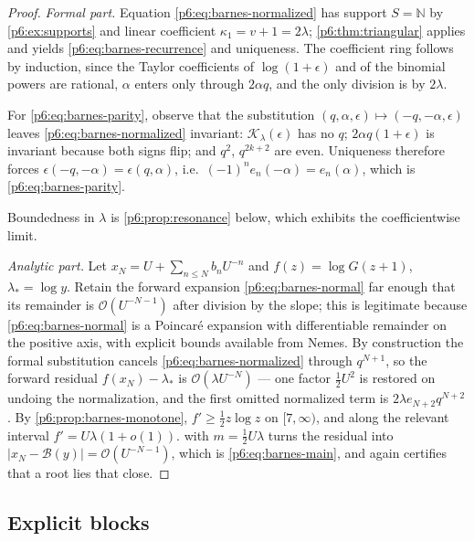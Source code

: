 \documentclass[11pt,a4paper,oneside]{book}
\theoremstyle{plain}
\theoremstyle{definition}
\theoremstyle{remark}
\newcommand{\Nat}{\mathbb{N}}
\newcommand{\bigO}{\mathcal{O}}
\newcommand{\littleo}{o}
\begin{document}
\begin{proof}
\emph{Formal part.}  Equation \eqref{p6:eq:barnes-normalized} has support
$S=\Nat$ by \cref{p6:ex:supports} and linear coefficient
$\kappa_1=v+1=2\lambda$; \cref{p6:thm:triangular} applies and yields
\eqref{p6:eq:barnes-recurrence} and uniqueness.  The coefficient ring follows
by induction, since the Taylor coefficients of $\log(1+\epsilon)$ and of the
binomial powers are rational, $\alpha$ enters only through $2\alpha q$, and
the only division is by $2\lambda$.

For \eqref{p6:eq:barnes-parity}, observe that the substitution
$(q,\alpha,\epsilon)\mapsto(-q,-\alpha,\epsilon)$ leaves
\eqref{p6:eq:barnes-normalized} invariant: $\mathcal{K}_\lambda(\epsilon)$ has
no $q$; $2\alpha q(1+\epsilon)$ is invariant because both signs flip; and
$q^{2}$, $q^{2k+2}$ are even.  Uniqueness therefore forces
$\epsilon(-q,-\alpha)=\epsilon(q,\alpha)$, i.e.\ $(-1)^{n}e_n(-\alpha)=
e_n(\alpha)$, which is \eqref{p6:eq:barnes-parity}.

Boundedness in $\lambda$ is \cref{p6:prop:resonance} below, which exhibits the
coefficientwise limit.

\emph{Analytic part.}  Let $x_N=U+\sum_{n\le N}b_nU^{-n}$ and
$f(z)=\log G(z+1)$, $\lambda_\ast=\log y$.  Retain the forward expansion
\eqref{p6:eq:barnes-normal} far enough that its remainder is
$\bigO(U^{-N-1})$ after division by the slope; this is legitimate because
\eqref{p6:eq:barnes-normal} is a Poincar\'e expansion with differentiable
remainder on the positive axis, with explicit bounds available from Nemes.
By construction the formal substitution cancels
\eqref{p6:eq:barnes-normalized} through $q^{N+1}$, so the forward residual
$f(x_N)-\lambda_\ast$ is $\bigO(\lambda U^{-N})$ --- one factor $\tfrac12U^{2}$
is restored on undoing the normalization, and the first omitted normalized
term is $2\lambda e_{N+2}q^{N+2}$.  By \cref{p6:prop:barnes-monotone},
$f'\ge\tfrac12z\log z$ on $[7,\infty)$, and along the relevant interval
$f'=U\lambda(1+\littleo(1))$.   with
$m=\tfrac12U\lambda$ turns the residual into
$|x_N-\mathcal{B}(y)|=\bigO(U^{-N-1})$, which is \eqref{p6:eq:barnes-main},
and again certifies that a root lies that close.
\end{proof}

\subsection{Explicit blocks}
\end{document}
